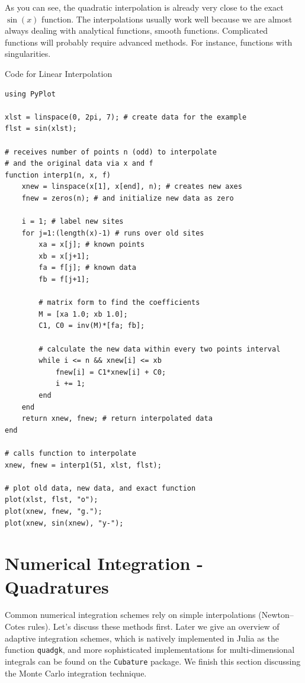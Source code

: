 As you can see, the quadratic interpolation is already very close to the exact $\sin(x)$ function. The interpolations usually work well because we are almost always dealing with analytical functions, smooth functions. Complicated functions will probably require advanced methods. For instance, functions with singularities.

\begin{example}{Code for Linear Interpolation}
\label{ex:quadraticinterp}
\begin{verbatim}
using PyPlot

xlst = linspace(0, 2pi, 7); # create data for the example
flst = sin(xlst);

# receives number of points n (odd) to interpolate
# and the original data via x and f
function interp1(n, x, f)
    xnew = linspace(x[1], x[end], n); # creates new axes
    fnew = zeros(n); # and initialize new data as zero

    i = 1; # label new sites
    for j=1:(length(x)-1) # runs over old sites
        xa = x[j]; # known points
        xb = x[j+1];
        fa = f[j]; # known data
        fb = f[j+1];
        
        # matrix form to find the coefficients
        M = [xa 1.0; xb 1.0];
        C1, C0 = inv(M)*[fa; fb];

        # calculate the new data within every two points interval
        while i <= n && xnew[i] <= xb
            fnew[i] = C1*xnew[i] + C0;
            i += 1;
        end
    end
    return xnew, fnew; # return interpolated data
end

# calls function to interpolate
xnew, fnew = interp1(51, xlst, flst);

# plot old data, new data, and exact function
plot(xlst, flst, "o");
plot(xnew, fnew, "g.");
plot(xnew, sin(xnew), "y-");
\end{verbatim}
\end{example}



\section{Numerical Integration - Quadratures}

Common numerical integration schemes rely on simple interpolations (Newton–Cotes rules). Let's discuss these methods first. Later we give an overview of adaptive integration schemes, which is natively implemented in Julia as the function \texttt{quadgk}, and more sophisticated implementations for multi-dimensional integrals can be found on the \texttt{Cubature} package. We finish this section discussing the Monte Carlo integration technique.

